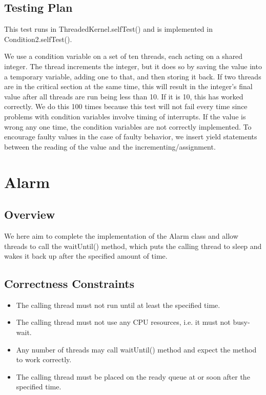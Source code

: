 \documentclass{article}
\begin{document}
\subsection{Testing Plan}

This test runs in ThreadedKernel.selfTest() and is implemented in Condition2.selfTest().

We use a condition variable on a set of ten threads, each acting on a shared integer. The thread increments the integer, but it does so by saving the value into a temporary variable, adding one to that, and then storing it back. If two threads are in the critical section at the same time, this will result in the integer's final value after all threads are run being less than 10. If it is 10, this has worked correctly. We do this 100 times because this test will not fail every time since problems with condition variables involve timing of interrupts. If the value is wrong any one time, the condition variables are not correctly implemented. To encourage faulty values in the case of faulty behavior, we insert yield statements between the reading of the value and the incrementing/assignment.

\section{Alarm}

\subsection{Overview}

We here aim to complete the implementation of the Alarm class and allow threads to call the waitUntil() method, which puts the calling thread to sleep and wakes it back up after the specified amount of time.

\subsection{Correctness Constraints}

\begin{itemize}
\item The calling thread must not run until at least the specified time.
\item The calling thread must not use any CPU resources, i.e. it must not busy-wait.
\item Any number of threads may call waitUntil() method and expect the method to work correctly.
\item The calling thread must be placed on the ready queue at or soon after the specified time.
\end{itemize}
\end{document}
